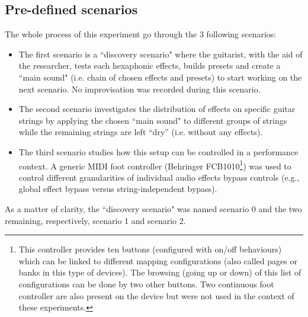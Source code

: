 \documentclass{article}
\begin{document}
\subsection{Pre-defined scenarios}
The whole process of this experiment go through the 3 following scenarios:
\begin{itemize}
    \item The first scenario is a ``discovery scenario" where the guitarist, with the aid of the researcher, tests each hexaphonic effects, builds presets and create a ``main sound" (i.e. chain of chosen effects and presets) to start working on the next scenario. No improvisation was recorded during this scenario.  
    
    \item The second scenario investigates the distribution of effects on specific guitar strings by applying the chosen ``main sound" to different groups of strings while the remaining strings are left ``dry'' (i.e. without any effects).
    
    \item The third scenario studies how this setup can be controlled in a performance context. A generic MIDI foot controller (Behringer FCB1010\footnote{\label{foot:Behringer1010}This controller provides ten buttons (configured with on/off behaviours) which can be linked to different mapping configurations (also called pages or banks in this type of devices). The browsing (going up or down) of this list of configurations can be done by two other buttons. Two continuous foot controller are also present on the device but were not used in the context of these experiments.}) was used to control different granularities of individual audio effects bypass controls (e.g., global effect bypass versus string-independent bypass). 
\end{itemize} 

As a matter of clarity, the ``discovery scenario" was named scenario 0 and the two remaining, respectively, scenario 1 and scenario 2.
\end{document}
